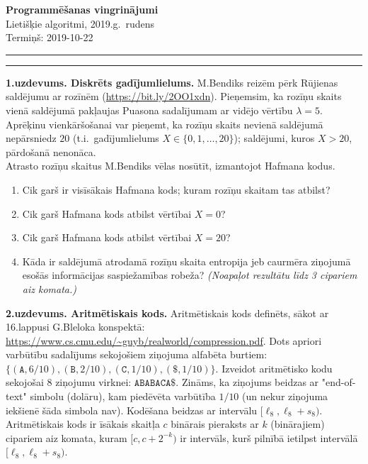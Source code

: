 \documentclass[a4paper,12pt]{article}
\begin{document}
\thispagestyle{empty}

\begin{center}
{\bf\Huge Programmēšanas vingrinājumi} \\[5pt]
Lietišķie algoritmi, 2019.g.\ rudens\\
Termiņš: 2019-10-22
\end{center}

\hrule
\vspace{2pt}
\hrule
\vspace{12pt}


\noindent
{\bf 1.uzdevums. Diskrēts gadījumlielums.}
M.Bendiks reizēm pērk Rūjienas saldējumu ar rozīnēm (\url{https://bit.ly/2OO1xdn}).
Pieņemsim, ka rozīņu skaits vienā saldējumā pakļaujas Puasona sadalījumam 
ar vidējo vērtību $\lambda = 5$. Aprēķinu vienkāršošanai var pieņemt, ka
rozīņu skaits nevienā saldējumā nepārsniedz $20$ (t.i.\ gadījumlielums
$X \in \{ 0,1,\ldots,20 \}$); saldējumi, kuros $X > 20$, 
pārdošanā nenonāca.\\
Atrasto rozīņu skaitus M.Bendiks vēlas nosūtīt, izmantojot Hafmana kodus. 
\begin{enumerate}
\item Cik garš ir visīsākais Hafmana kods; kuram rozīņu skaitam tas atbilst?
\item Cik garš Hafmana kods atbilst vērtībai $X=0$?
\item Cik garš Hafmana kods atbilst vērtībai $X=20$?
\item Kāda ir saldējumā atrodamā rozīņu skaita entropija jeb caurmēra ziņojumā
esošās informācijas saspiežamības robeža? {\em (Noapaļot rezultātu līdz 3 cipariem 
aiz komata.)}
\end{enumerate}

\vspace{6pt}
{\bf 2.uzdevums. Aritmētiskais kods.}
Aritmētiskais kods definēts, sākot ar 16.lappusi G.Bleloka konspektā: 
\url{https://www.cs.cmu.edu/~guyb/realworld/compression.pdf}. 
Dots apriori varbūtību sadalījums sekojošiem ziņojuma alfabēta 
burtiem: $\{ (\mathtt{A},6/10), (\mathtt{B},2/10), (\mathtt{C},1/10), 
(\mathtt{\$},1/10) \}$. Izveidot aritmētisko kodu sekojošai $8$ ziņojumu virknei:
$\mathtt{ABABACA\$}$.
Zināms, ka ziņojums beidzas ar "end-of-text" simbolu (dolāru), kam piedēvēta varbūtība $1/10$
(un nekur ziņojuma iekšienē šāda simbola nav).  
Kodēšana beidzas ar intervālu $[\ell_8,\ell_8+s_8)$. 
Aritmētiskais kods ir īsākais skaitļa $c$ binārais pieraksts ar $k$ (binārajiem) cipariem 
aiz komata, kuram $[c,c+2^{-k})$ ir intervāls, kurš pilnībā ietilpst
intervālā $[\ell_8,\ell_8+s_8)$.
\end{document}
